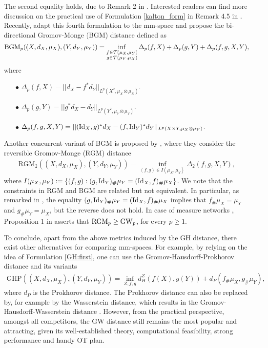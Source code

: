 The second equality holds, due to Remark 2 in \citep{Memoli05}. Interested readers can find
more discussion on the practical use of Formulation \eqref{kalton_form} in
Remark 4.5 in \citep{Memoli11b}.
Recently, \citep{Zhang21} adapt this fourth formulation to the mm-space and propose
the bi-directional Gromov-Monge (BGM) distance defined as
\begin{align}
  \text{BGM}_p((X, d_X, \mu_X), (Y, d_Y, \mu_Y)) =
  \inf_{\substack{f \in \mathcal T(\mu_X, \mu_Y) \\ g \in \mathcal T(\mu_Y, \mu_X)}}
  \Delta_{p}(f,X) + \Delta_{p}(g,Y) + \Delta_{p}(f,g, X, Y),
\end{align}
where
\begin{itemize}
  \item[$\bullet$] $\Delta_{p}(f, X) = || d_X - f^* d_Y ||_{L^p(X^2, \mu_X \otimes \mu_X)}$.
  \item[$\bullet$] $\Delta_{p}(g, Y) = || g^* d_X - d_Y ||_{L^p(Y^2, \mu_Y \otimes \mu_Y)}$.
  \item[$\bullet$] $\Delta_{p}(f,g, X, Y) = || (\text{Id}_X, g)^*d_X - (f, \text{Id}_Y)^*d_Y ||_{L^p(X \times Y, \mu_X \otimes \mu_Y)}$.
\end{itemize}
Another concurrent variant of BGM is proposed by \citep{Hur21},
where they consider the reversible Gromov-Monge (RGM) distance
\begin{align}
  \text{RGM}_2((X, d_X, \mu_X), (Y, d_Y, \mu_Y)) =
  \inf_{(f,g) \in I(\mu_X, \mu_Y)} \Delta_2(f,g, X, Y),
\end{align}
where $I(\mu_X, \mu_Y) := \{(f, g): (g, \text{Id}_Y)_{\#} \mu_Y = (\text{Id}_X, f)_{\#} \mu_X \}$.
We note that the constraints in RGM and BGM are related but not equivalent. In particular,
as remarked in \citep{Hur21}, the equality $(g, \text{Id}_Y)_{\#} \mu_Y = (\text{Id}_X, f)_{\#} \mu_X$
implies that $ f_{\#}\mu_X = \mu_Y$ and $g_{\#} \mu_Y = \mu_X$, but the reverse does not hold.
In case of measure networks \citep{Chowdhury19}, Proposition 1 in \citep{Hur21} asserts that
$\text{RGM}_p \geq \text{GW}_p$, for every $p \geq 1$.

To conclude, apart from the above metrics induced by the GH distance, there exist other
alternatives for comparing mm-spaces. For example, by relying on the idea of
Formulation \eqref{GH:first},
one can use the Gromov-Hausdorff-Prokhorov distance \citep{Villani08} and
its variants \citep{Abraham13,Miermont09}
\begin{align}
  \text{GHP}((X, d_X, \mu_X), (Y, d_Y, \mu_Y)) =
  \inf_{Z, f, g} d_H^Z(f(X), g(Y)) + d_P(f_{\#} \mu_X, g_{\#} \mu_Y),
\end{align}
where $d_P$ is the Prokhorov distance. The Prokhorov distance can also be replaced by,
for example by the Wasserstein distance, which results in the
Gromov-Hausdorff-Wasserstein distance \citep{Villani08}. However, from the practical perspective,
amongst all competitors, the GW distance still remains the most popular and attracting,
given its well-established theory, computational feasibility, strong performance and
handy OT plan.

